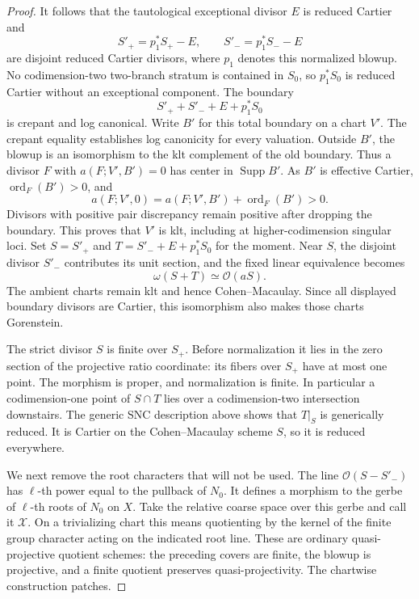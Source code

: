 \documentclass[11pt,letterpaper]{article}
\newcommand{\OO}{\mathcal{O}}
\DeclareMathOperator{\Supp}{Supp}
\DeclareMathOperator{\ord}{ord}
\theoremstyle{definition}
\theoremstyle{remark}
\begin{document}
\begin{proof}
It follows that the tautological exceptional divisor $E$ is
reduced Cartier and
\[
 S'_+=p_1^*S_+-E,\qquad S'_-=p_1^*S_--E
\]
are disjoint reduced Cartier divisors, where $p_1$ denotes this
normalized blowup.  No codimension-two two-branch stratum is
contained in $S_0$, so $p_1^*S_0$ is reduced Cartier without an
exceptional component.  The boundary
\[
 S'_++S'_-+E+p_1^*S_0
\]
is crepant and log canonical.  Write $B'$ for this total
boundary on a chart $V'$.  The crepant equality establishes
log canonicity for every valuation.  Outside $B'$, the
blowup is an isomorphism to the klt complement of the old
boundary.  Thus a divisor $F$ with
$a(F;V',B')=0$ has center in $\Supp B'$.  As $B'$ is
effective Cartier, $\ord_F(B')>0$, and
\[
 a(F;V',0)=a(F;V',B')+\ord_F(B')>0.
\]
Divisors with positive pair discrepancy remain positive
after dropping the boundary.  This proves that $V'$ is
klt, including at higher-codimension singular loci.  Set
$S=S'_+$ and $T=S'_-+E+p_1^*S_0$ for the moment.
Near $S$, the disjoint divisor $S'_-$ contributes its unit
section, and the fixed linear equivalence becomes
\[
 \omega(S+T)\simeq\OO(aS).
\]
The ambient charts remain klt and hence Cohen--Macaulay.
Since all displayed boundary divisors are Cartier, this
isomorphism also makes those charts Gorenstein.

The strict divisor $S$ is finite over $S_+$.
Before normalization it lies in the zero section of the
projective ratio coordinate: its fibers over $S_+$ have at
most one point.  The morphism is proper, and normalization is
finite.  In particular a codimension-one point of $S\cap T$
lies over a codimension-two intersection downstairs.  The
generic SNC description above shows that $T|_S$ is generically
reduced.  It is Cartier on the Cohen--Macaulay scheme $S$,
so it is reduced everywhere.

We next remove the root characters that will not be used.
The line $\OO(S-S'_-)$ has $\ell$-th power equal to the pullback
of $N_0$.  It defines a morphism to the gerbe of $\ell$-th roots
of $N_0$ on $X$.  Take the relative coarse space over this
gerbe and call it $\mathcal X$.  On a trivializing chart this
means quotienting by the kernel of the finite group character
acting on the indicated root line.  These are ordinary
quasi-projective quotient schemes: the preceding covers are
finite, the blowup is projective, and a finite quotient preserves
quasi-projectivity.  The chartwise construction patches.


\end{proof}
\end{document}
